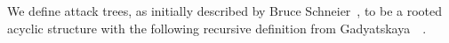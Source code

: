 
We define attack trees, as initially described by Bruce Schneier~\cite{schneierAttackTrees1999}, to be a rooted acyclic structure with the following recursive definition  from Gadyatskaya~\etal~\cite{gadyatskayaRefinementAwareGenerationAttack2017}.

